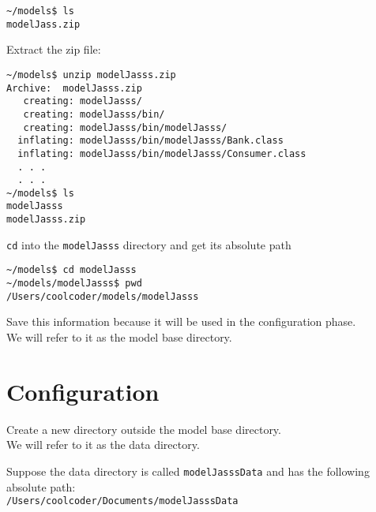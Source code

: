 \documentclass{article}
\begin{document}
\vskip2mm
\noindent\verb+~/models$ +\color{red}\verb+ls+ \color{blue}\\
\verb+modelJass.zip+
\color{black}

\vskip2mm
Extract the zip file:

\vskip2mm
\noindent\verb+~/models$ +\color{red}\verb+unzip modelJasss.zip+ \color{blue}\\
\verb+Archive:  modelJasss.zip+\\
\verb+   creating: modelJasss/+\\
\verb+   creating: modelJasss/bin/+\\
\verb+   creating: modelJasss/bin/modelJasss/+\\
\verb+  inflating: modelJasss/bin/modelJasss/Bank.class+\\ 
\verb+  inflating: modelJasss/bin/modelJasss/Consumer.class+\\ 
\verb+  . . .+\\
\verb+  . . .+\\
\color{black}
\noindent\verb+~/models$ +\color{red}\verb+ls+ \color{blue}\\
\verb+modelJasss+\\
\verb+modelJasss.zip+\\
\color{black}

\verb+cd+ into the \verb+modelJasss+ directory and get its absolute path  



\vskip2mm
\noindent\verb+~/models$ +\color{red}\verb+cd modelJasss+ \color{black}\\
\verb+~/models/modelJasss$ +\color{red}\verb+pwd+ \color{blue}\\
\verb+/Users/coolcoder/models/modelJasss+
\color{black}
\vskip2mm


Save this information because it will be used in the configuration phase. \\ We will refer to it as the model base directory.


\section{Configuration}

Create a new directory outside the model base directory. \\ We will refer to it as the data directory.

Suppose the data directory is called \verb+modelJasssData+ and has the following absolute path: \\
\verb+/Users/coolcoder/Documents/modelJasssData+
\end{document}

